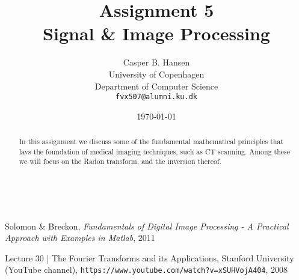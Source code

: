 \documentclass[11pt]{article}
\title
{
    {\Large Assignment 5} \\
    Signal \& Image Processing
}
\author
{
    Casper B. Hansen \\
    University of Copenhagen \\
    Department of Computer Science \\
    {\tt fvx507@alumni.ku.dk}
}
\date{\today}
\begin{document}
\maketitle
\thispagestyle{empty}
\begin{multicols}{2}
    \begin{abstract}
        In this assignment we discuss some of the fundamental mathematical
        principles that lays the foundation of medical imaging techniques,
        such as CT scanning. Among these we will focus on the Radon transform,
        and the inversion thereof.
    \end{abstract}
    \vfill{\ }\columnbreak
    \tableofcontents
\end{multicols}
\clearpage




\appendix


\begin{thebibliography}{9}

    Solomon \& Breckon,
    \emph{Fundamentals of Digital Image Processing - A Practical Approach with
    Examples in Matlab},
    2011

    Lecture 30 | The Fourier Transforms and its Applications,
    Stanford University (YouTube channel),
    {\tt https://www.youtube.com/watch?v=xSUHVojA404},
    2008

\end{thebibliography}
\end{document}
